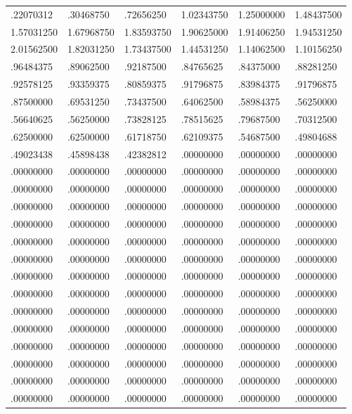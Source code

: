 \documentclass[11pt]{article}
\theoremstyle{definition}
\theoremstyle{remark}
\begin{document}
\small
\begin{longtable}{llllll}
.22070312 & .30468750 & .72656250 & 1.02343750 & 1.25000000 & 1.48437500 \\
1.57031250 & 1.67968750 & 1.83593750 & 1.90625000 & 1.91406250 & 1.94531250 \\
2.01562500 & 1.82031250 & 1.73437500 & 1.44531250 & 1.14062500 & 1.10156250 \\
.96484375 & .89062500 & .92187500 & .84765625 & .84375000 & .88281250 \\
.92578125 & .93359375 & .80859375 & .91796875 & .83984375 & .91796875 \\
.87500000 & .69531250 & .73437500 & .64062500 & .58984375 & .56250000 \\
.56640625 & .56250000 & .73828125 & .78515625 & .79687500 & .70312500 \\
.62500000 & .62500000 & .61718750 & .62109375 & .54687500 & .49804688 \\
.49023438 & .45898438 & .42382812 & .00000000 & .00000000 & .00000000 \\
.00000000 & .00000000 & .00000000 & .00000000 & .00000000 & .00000000 \\
.00000000 & .00000000 & .00000000 & .00000000 & .00000000 & .00000000 \\
.00000000 & .00000000 & .00000000 & .00000000 & .00000000 & .00000000 \\
.00000000 & .00000000 & .00000000 & .00000000 & .00000000 & .00000000 \\
.00000000 & .00000000 & .00000000 & .00000000 & .00000000 & .00000000 \\
.00000000 & .00000000 & .00000000 & .00000000 & .00000000 & .00000000 \\
.00000000 & .00000000 & .00000000 & .00000000 & .00000000 & .00000000 \\
.00000000 & .00000000 & .00000000 & .00000000 & .00000000 & .00000000 \\
.00000000 & .00000000 & .00000000 & .00000000 & .00000000 & .00000000 \\
.00000000 & .00000000 & .00000000 & .00000000 & .00000000 & .00000000 \\
.00000000 & .00000000 & .00000000 & .00000000 & .00000000 & .00000000 \\
.00000000 & .00000000 & .00000000 & .00000000 & .00000000 & .00000000 \\
.00000000 & .00000000 & .00000000 & .00000000 & .00000000 & .00000000 \\
.00000000 & .00000000 & .00000000 & .00000000 & .00000000 & .00000000 \\

\end{longtable}
\end{document}
